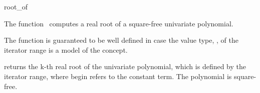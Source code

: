 \begin{ccRefFunction}{root_of}

\ccDefinition

The function \ccRefName\ computes a real root of a square-free univariate 
polynomial.

The function is guaranteed to be well defined in case the value type, ,
of the iterator range is a model of the  concept. 


        {
        returns the k-th real root of the univariate polynomial, 
        which is defined by the iterator range, 
        where begin refers to the constant term. 
        \ccPrecond The polynomial is square-free. 
        }


\ccSeeAlso

\\
\\


\end{ccRefFunction}
